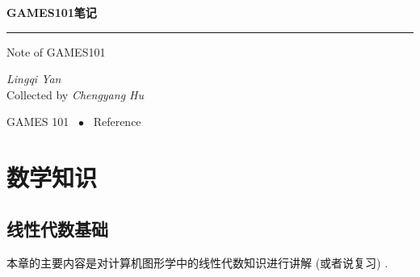 \documentclass[openany]{progbookcn}
\begin{document}
	



\begin{titlepage}
  \vspace*{25ex}

  \hspace{0.05\textwidth}\begin{minipage}{.9\textwidth}
    \flushright

    {\textbf{GAMES101笔记}}

    \rule{\linewidth}{.5pt}

    \vspace{2ex}

    {\textsf{Note of GAMES101}} \\

    \vspace{20ex}

    { \textit{Lingqi Yan} \\Collected by \textit{Chengyang Hu}}
  \end{minipage}

  \vfill

  \centering
  {GAMES 101 ~$\bullet$ ~Reference}
\end{titlepage}
\thispagestyle{empty}


\frontmatter








\clearpage
{
  \hypersetup{hidelinks}
  \tableofcontents
}


\mainmatter

\part{数学知识}

\chapter{线性代数基础}

本章的主要内容是对计算机图形学中的线性代数知识进行讲解 (或者说复习) . 
\end{document}
